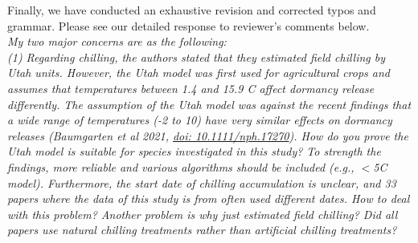 \documentclass[11pt]{article}
\begin{document}
Finally, we have conducted an exhaustive revision and corrected typos and grammar. Please see our detailed response to reviewer's comments below. \\

\emph{My two major concerns are as the following:}\\
\emph{(1) Regarding chilling, the authors stated that they estimated field chilling by Utah units. However, the Utah model was first used for agricultural crops and assumes that temperatures between 1.4 and 15.9 \degree C affect dormancy release differently. The assumption of the Utah model was against the recent findings that a wide range of temperatures (-2 to 10\degreeC) have very similar effects on dormancy releases (Baumgarten et al 2021, \url{doi: 10.1111/nph.17270}). How do you prove the Utah model is suitable for species investigated in this study? To strength the findings, more reliable and various algorithms should be included (e.g., $<$5\degree C model). Furthermore, the start date of chilling accumulation is unclear, and 33 papers where the data of this study is from often used different dates. How to deal with this problem? Another problem is why just estimated field chilling? Did all papers use natural chilling treatments rather than artificial chilling treatments?}\\
\end{document}
